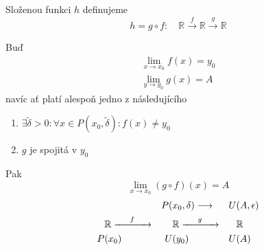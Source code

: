 \begin{definition}[name=Složená funkce, label=compoundFunction]
    Složenou funkci $h$ definujeme
    \begin{equation*}
         h = g\circ f:\quad \mathbb{R}\xrightarrow{f}\mathbb{R}\xrightarrow{g}\mathbb{R}
    \end{equation*}
\end{definition}

\begin{theorem}[name=Limita superpozice, label=T-limitSuperposition]
    Buď
    \begin{align}
        \lim_{x\to x_0}f(x)=y_0 \\
        \lim_{y\to y_0}g(x)=A
    \end{align}
    navíc ať platí alespoň jedno z následujícího
    \begin{enumerate}
        \item $\exists\tilde{\delta}>0:\forall x\in P(x_0,\tilde{\delta}):f(x)\neq y_0$
            \label{T-limitSuperposition-1}
        \item $g$ je spojitá v $y_0$ \label{T-limitSuperposition-2}
    \end{enumerate}
    Pak
    \begin{equation}
        \lim_{x\to x_0}(g\circ f)(x)=A
    \end{equation}
    \begin{alignat}{3}
        &\quad &P(&x_0,\delta) \longrightarrow &U&(A,\epsilon) \nonumber\\
        &\mathbb{R}\mylongrightarrow{f}{5} &&\mathbb{R}\mylongrightarrow{g}{5} &&\mathbb{R} \\
        P&(x_0) &U&(y_0) &U&(A) \nonumber
    \end{alignat}
\end{theorem}
